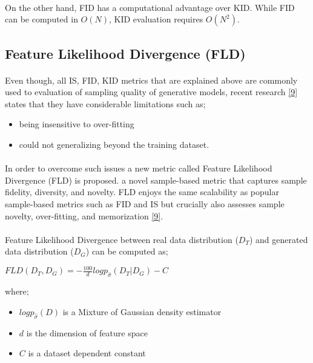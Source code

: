 \documentclass{article}
\begin{document}
        \paragraph{}
        On the other hand, FID has a computational advantage over KID. While FID can be computed in $O(N)$, KID evaluation requires $O(N^2)$.
        
    \subsection{Feature Likelihood Divergence (FLD)}
    \paragraph{}
    Even though, all IS, FID, KID metrics that are explained above are commonly used to evaluation of sampling quality of generative models, recent research \hyperref[sec: ref9]{[9]} states that they have considerable limitations such as;
    \begin{itemize}
        \item being insensitive to over-fitting
        \item could not generalizing beyond the training dataset.
    \end{itemize}
    \paragraph{}
    In order to overcome such issues a new metric called Feature Likelihood Divergence (FLD) is proposed. a novel sample-based metric that captures sample fidelity, diversity, and novelty. FLD enjoys the same scalability as popular sample-based metrics such as FID and IS but crucially also assesses sample novelty, over-fitting, and memorization \hyperref[sec: ref9]{[9]}.

    \paragraph{}
    Feature Likelihood Divergence between real data distribution ($D_T$) and generated data distribution ($D_G$) can be computed as;
    \begin{center}
        $FLD(D_T, D_G) = -\frac{100}{d}logp_{\hat{\sigma}}(D_T|D_G) - C$
    \end{center}
    where;
    \begin{itemize}
        \item $logp_{\hat{\sigma}}(D)$ is a Mixture of Gaussian density estimator
        \item $d$ is the dimension of feature space
        \item $C$ is a dataset dependent constant
    \end{itemize}
\end{document}
